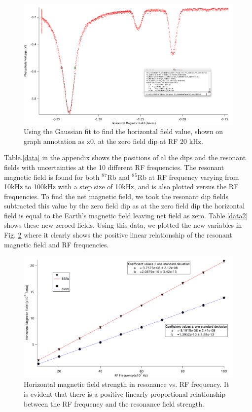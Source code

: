 \documentclass[prb,preprint]{revtex4-1}
\begin{document}
\begin{figure}[h]
\centering
\includegraphics[width=16cm]{gau}
\caption{Using the Gaussian fit to find the horizontal field value, shown on graph annotation as x0, at the zero field dip at RF 20 kHz.}
\label{gau}
\end{figure}


Table.\ref{data} in the appendix shows the positions of al the dips and the resonant fields with uncertainties at the 10 different RF frequencies. The resonant magnetic field is found for both $^8$$^7$Rb and $^8$$^5$Rb at RF frequency varying from 10kHz to 100kHz with a step size of 10kHz, and is also plotted versus the RF frequencies. To find the net magnetic field, we took the resonant dip fields subtracted this value by the zero field dip as at the zero field dip the horizontal field is equal to the Earth's magnetic field leaving net field as zero. Table.\ref{data2} shows these new zeroed fields. Using this data, we plotted the new variables in Fig. \ref{both} where it clearly shows the positive linear relationship of the resonant magnetic field and RF frequencies. \\


\begin{figure}[h]
\centering
\includegraphics[width=16cm]{slopegraph.png}
\caption{Horizontal magnetic field strength in resonance vs. RF frequency. It is evident that there is a positive linearly proportional relationship between the RF frequency and the resonance field strength. }
\label{both}
\end{figure}
\end{document}
